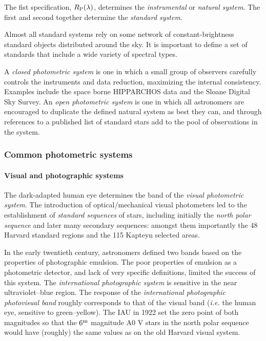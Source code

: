 \documentclass{article}
\begin{document}
The fist specification, $R_{\rm P}(\lambda)$, determines the
{\it instrumental} or {\it natural system}. The first and second
together determine the {\it standard system}. 

Almost all standard systems rely on some network of
constant-brightness standard objects distributed around the sky. It is
important to define a set of standards that include a wide variety of
spectral types.

A {\it closed photometric system} is one in which a small group of
observers carefully controls the instruments and data reduction,
maximizing the internal consistency. Examples include the space borne
HIPPARCHOS data and the Sloane Digital Sky Survey. An {\it open
  photometric system}  is one in which all astronomers are encouraged
to duplicate the defined natural system as best they can, and through
references to a published list of standard stars add to the pool of
observations in the system.

\subsubsection{Common photometric systems}

\paragraph{Visual and photographic systems} The dark-adapted human eye
determines the band of the {\it visual photometric system}. The
introduction of optical/mechanical visual photometers led to the
establishment of {\it standard sequences} of stars, including
initially the {\it north polar sequence} and later many secondary
sequences: amongst them importantly the 48 Harvard standard regions and the 115 Kapteyn
selected areas.

In the
early twentieth century, astronomers defined two bands based on the
properties of photographic emulsion. The
poor properties of emulsion as a photometric detector, and lack of 
very specific definitions, limited the success of this system. The
{\it international photographic system} is sensitive in the near
ultraviolet--blue region. The response of the {\it international
  photographic photovisual band} roughly corresponds to that of the
visual band ({\it i.e.} the human eye, sensitive to green--yellow). The
IAU in 1922 set the zero point of both magnitudes so that the $6^{\rm
  m}$ magnitude A0 V stars in the north polar sequence would have
(roughly) the same values as on the old Harvard visual system.
\end{document}
